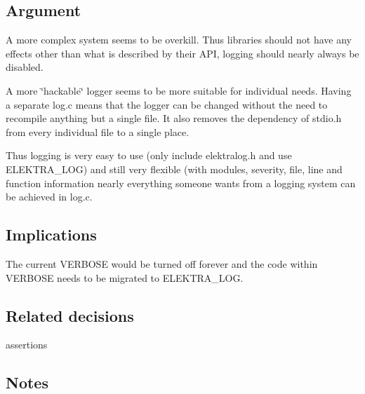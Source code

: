 \subsection*{Argument}

A more complex system seems to be overkill. Thus libraries should not have any effects other than what is described by their A\+P\+I, logging should nearly always be disabled.

A more \char`\"{}hackable\char`\"{} logger seems to be more suitable for individual needs. Having a separate {\ttfamily log.\+c} means that the logger can be changed without the need to recompile anything but a single file. It also removes the dependency of {\ttfamily stdio.\+h} from every individual file to a single place.

Thus logging is very easy to use (only include {\ttfamily elektralog.\+h} and use {\ttfamily E\+L\+E\+K\+T\+R\+A\+\_\+\+L\+O\+G}) and still very flexible (with modules, severity, file, line and function information nearly everything someone wants from a logging system can be achieved in {\ttfamily log.\+c}.

\subsection*{Implications}

The current V\+E\+R\+B\+O\+S\+E would be turned off forever and the code within V\+E\+R\+B\+O\+S\+E needs to be migrated to {\ttfamily E\+L\+E\+K\+T\+R\+A\+\_\+\+L\+O\+G}.

\subsection*{Related decisions}


\begin{DoxyItemize}
\item assertions
\end{DoxyItemize}

\subsection*{Notes}